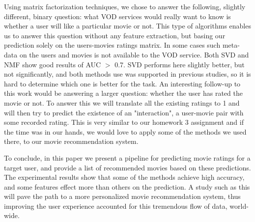 Using matrix factorization techniques, we chose to answer the following, slightly different, binary question: what VOD services would really want to know is whether a user will like a particular movie or not. This type of algorithms enables us to answer this question without any feature extraction, but basing our prediction solely on the users-movies ratings matrix. In some cases such meta-data on the users and movies is not available to the VOD service. Both SVD and NMF show good results of AUC $>$ 0.7. SVD performs here slightly better, but not significantly, and both methods use was supported in previous studies, so it is hard to determine which one is better for the task. An interesting follow-up to this work would be answering a larger question: whether the user has rated the movie or not. To answer this we will translate all the existing ratings to 1 and will then try to predict the existence of an "interaction", a user-movie pair with some recorded rating. This is very similar to our homework 3 assignment and if the time was in our hands, we would love to apply some of the methods we used there, to our movie recommendation system.

To conclude, in this paper we present a pipeline for predicting movie ratings for a target user, and provide a list of recommended movies based on these predictions. The experimental results show that some of the methods achieve high accuracy, and some features effect more than others on the prediction. A study such as this will pave the path to a more personalized movie recommendation system, thus improving the user experience accounted for this tremendous flow of data, world-wide.

